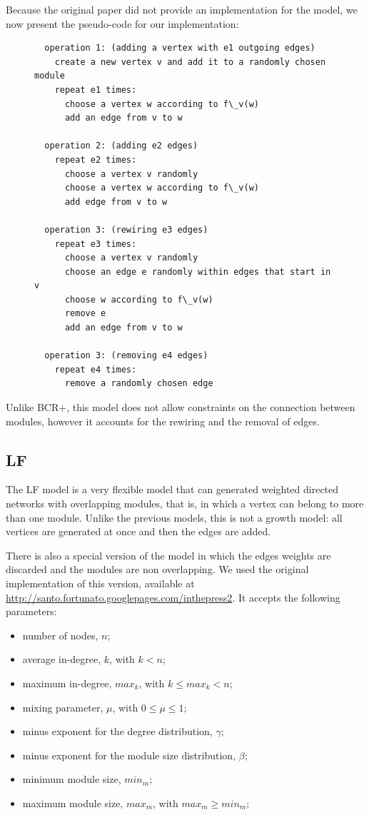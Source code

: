 Because the original paper did not provide an implementation for the model, we
now present the pseudo-code for our implementation:

\begin{figure}
\begin{verbatim}
  operation 1: (adding a vertex with e1 outgoing edges)
    create a new vertex v and add it to a randomly chosen module
    repeat e1 times:
      choose a vertex w according to f\_v(w)
      add an edge from v to w

  operation 2: (adding e2 edges)
    repeat e2 times:
      choose a vertex v randomly
      choose a vertex w according to f\_v(w)
      add edge from v to w

  operation 3: (rewiring e3 edges)
    repeat e3 times:
      choose a vertex v randomly
      choose an edge e randomly within edges that start in v
      choose w according to f\_v(w)
      remove e
      add an edge from v to w

  operation 3: (removing e4 edges)
    repeat e4 times:
      remove a randomly chosen edge
\end{verbatim}
\end{figure}

Unlike BCR+, this model does not allow constraints on the connection between
modules, however it accounts for the rewiring and the removal of edges. 

\subsection{LF}

The LF model \cite{Lancichinetti2009} is a very flexible model that can
generated weighted directed networks with overlapping modules, that is, in which
a vertex can belong to more than one module. Unlike the previous models, this is
not a growth model: all vertices are generated at once and then the edges are
added.

There is also a special version of the model in which the edges weights are
discarded and the modules are non overlapping. We used the original
implementation of this version, available at
\url{http://santo.fortunato.googlepages.com/inthepress2}. It accepts the following
parameters:

\begin{itemize}
\item number of nodes, $n$;
\item average in-degree, $k$, with $k < n$;
\item maximum in-degree, $max_k$, with $k \le max_k < n$;
\item mixing parameter, $\mu$, with $0 \le \mu \le 1$;
\item minus exponent for the degree distribution, $\gamma$;
\item minus exponent for the module size distribution, $\beta$;
\item minimum module size, $min_m$;
\item maximum module size, $max_m$, with $max_m \ge min_m$;
\end{itemize}

